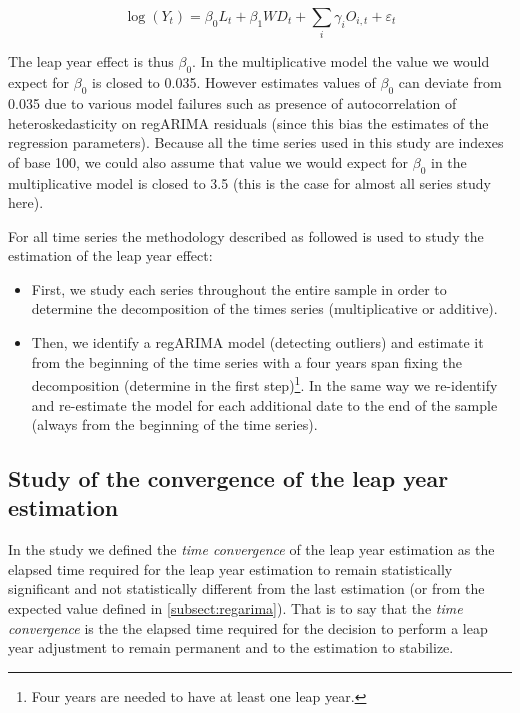 \documentclass[]{article}
\providecommand{\tightlist}{%
  \setlength{\itemsep}{0pt}\setlength{\parskip}{0pt}}
\let\rmarkdownfootnote\footnote%
\def\footnote{\protect\rmarkdownfootnote}
\theoremstyle{definition}
\theoremstyle{definition}
\theoremstyle{definition}
\theoremstyle{remark}
\begin{document}
\begin{equation} 
\log(Y_t) = \beta_0 L_t + \beta_1 WD_t + \sum_{i}\gamma_iO_{i,t} + \varepsilon_t
 \label{eq:model-log}
\end{equation}

The leap year effect is thus \(\beta_0\). In the multiplicative model
the value we would expect for \(\beta_0\) is closed to 0.035. However
estimates values of \(\beta_0\) can deviate from 0.035 due to various
model failures such as presence of autocorrelation of heteroskedasticity
on regARIMA residuals (since this bias the estimates of the regression
parameters). Because all the time series used in this study are indexes
of base 100, we could also assume that value we would expect for
\(\beta_0\) in the multiplicative model is closed to 3.5 (this is the
case for almost all series study here).

For all time series the methodology described as followed is used to
study the estimation of the leap year effect:

\begin{itemize}
\tightlist
\item
  First, we study each series throughout the entire sample in order to
  determine the decomposition of the times series (multiplicative or
  additive).\\
\item
  Then, we identify a regARIMA model (detecting outliers) and estimate
  it from the beginning of the time series with a four years span fixing
  the decomposition (determine in the first step)\footnote{Four years
    are needed to have at least one leap year.}. In the same way we
  re-identify and re-estimate the model for each additional date to the
  end of the sample (always from the beginning of the time series).
\end{itemize}

\subsection{Study of the convergence of the leap year
estimation}\label{subsect:etud-conv}

In the study we defined the \emph{time convergence} of the leap year
estimation as the elapsed time required for the leap year estimation to
remain statistically significant and not statistically different from
the last estimation (or from the expected value defined in
\ref{subsect:regarima}). That is to say that the \emph{time convergence}
is the the elapsed time required for the decision to perform a leap year
adjustment to remain permanent and to the estimation to stabilize.
\end{document}

